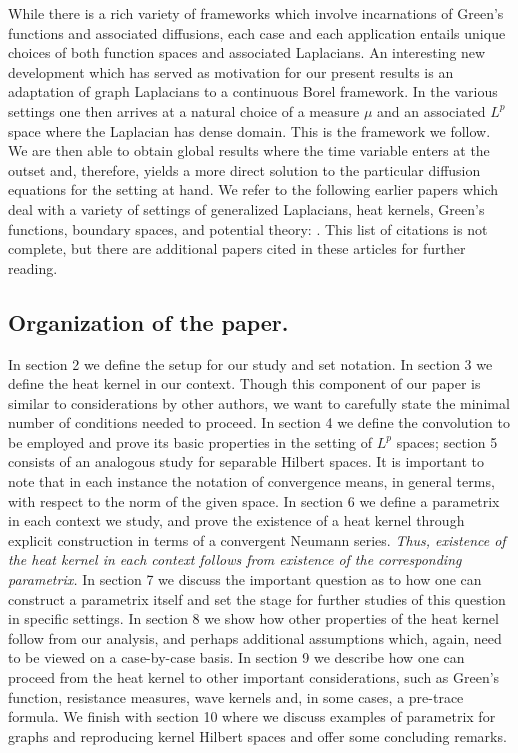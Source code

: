 \documentclass[11pt,reqno]{amsart}
\theoremstyle{remark}
\theoremstyle{definition}
\numberwithin{theorem}{section} \numberwithin{equation}{section}
\begin{document}
While there is a rich variety of frameworks which involve incarnations of Green's functions and associated diffusions, each case and each application entails unique choices of both function spaces and associated Laplacians.  %
An interesting new development which has served as motivation for our present results is an adaptation of graph Laplacians to a continuous Borel framework. In the various settings one then arrives at a natural choice of a measure $\mu$ and an associated $L^p$ space where the Laplacian has dense domain. This is the framework we follow.
We are then able to obtain global results where the time variable enters at the outset and, therefore, yields a more direct solution to the particular diffusion equations for the setting at hand.  We refer to the following earlier papers which deal with a variety of settings of generalized Laplacians, heat kernels, Green's functions, boundary spaces, and potential theory:   \cite{AJ24, B-GS-KSY06, BJ24, JS23, JST24, JT25b, St90}.  This list of citations is not complete, but there are additional papers cited in these articles for further reading.

\subsection{Organization of the paper.}
In section 2 we define the setup for our study and set notation.  In section 3
we define the heat kernel in our context.  Though this component of our paper is similar to considerations by other authors, we want to carefully state
the minimal number of conditions needed to proceed.  In section 4 we define the convolution to be employed and prove its basic properties
in the setting of $L^{p}$ spaces; section 5 consists of an analogous study for separable Hilbert spaces.  It is important to note that
in each instance the notation of convergence means, in general terms, with respect to the norm of the given space.  In section 6 we define
a parametrix in each context we study, and prove the existence of a heat kernel through explicit construction in terms of a convergent Neumann series.
{\it Thus, existence of the heat kernel in each context follows from existence of the corresponding parametrix.}
In section 7 we discuss the important question as to how one can construct a parametrix itself and set the stage for further studies of this question in specific settings.  In section 8 we show how other properties of the heat kernel follow from our analysis,
and perhaps additional assumptions which, again, need to be viewed on a case-by-case basis.
In section 9 we describe how one can proceed from the heat kernel to other important
considerations, such as Green's
function, resistance measures, wave kernels and, in some cases, a pre-trace formula.  We finish with section 10 where we discuss examples of parametrix for graphs and reproducing kernel Hilbert spaces and offer some concluding remarks.
\end{document}
